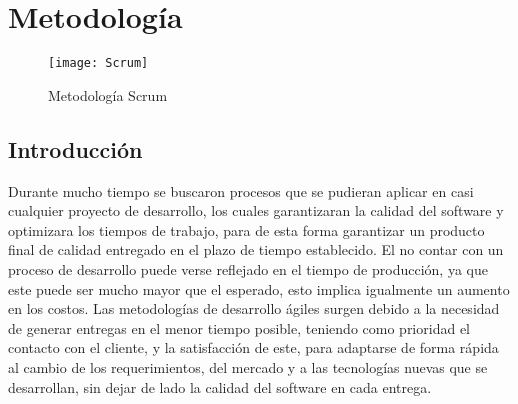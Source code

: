 \chapter{Metodología}
\begin{figure}[th!]
	\centering
	\texttt{[image: Scrum]}
    \caption{Metodología Scrum}
	\label{fig:Scrum}
\end{figure}
\section{Introducción}
Durante mucho tiempo se buscaron procesos  que se pudieran aplicar en casi cualquier proyecto de desarrollo, los cuales garantizaran la calidad del software y optimizara los tiempos de trabajo, para de esta forma garantizar un producto final de calidad entregado en el plazo de tiempo establecido. El no contar con un proceso de desarrollo puede verse reflejado en el tiempo de producción, ya que este puede ser mucho mayor que el esperado, esto implica igualmente un aumento en los costos.
Las metodologías de desarrollo ágiles surgen debido a la necesidad de generar entregas en el menor tiempo posible, teniendo como prioridad el contacto con el cliente, y la satisfacción de este, para adaptarse de forma rápida al cambio de los requerimientos, del mercado  y a las tecnologías nuevas que se desarrollan, sin dejar de lado la calidad del software en cada entrega.
\newpage
